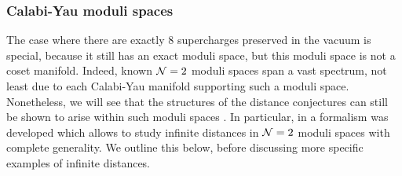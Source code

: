 \documentclass[11pt,a4paper]{article}
\numberwithin{equation}{section}
\numberwithin{table}{section}\setlength{\multlinegap}{25pt}
\begin{document}
\subsubsection{Calabi-Yau moduli spaces}
\label{sec:cymod}

The case where there are exactly 8 supercharges preserved in the vacuum is special, because it still has an exact moduli space, but this moduli space is not a coset manifold. Indeed, known ${\cal N}=2$ moduli spaces span a vast spectrum, not least due to each Calabi-Yau manifold supporting such a moduli space. Nonetheless, we will see that the structures of the distance conjectures can still be shown to arise within such moduli spaces \cite{Grimm:2018ohb,Blumenhagen:2018nts,Lee:2018urn,Grimm:2018cpv,Corvilain:2018lgw,Lee:2019tst,Joshi:2019nzi}. In particular, in \cite{Grimm:2018ohb,Grimm:2018cpv} a formalism was developed which allows to study infinite distances in ${\cal N}=2$ moduli spaces with complete generality. We outline this below, before discussing more specific examples of infinite distances. 
\end{document}
